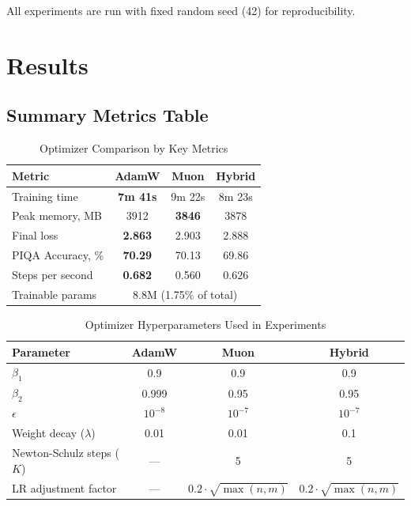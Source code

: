 \documentclass[a4paper,12pt]{article}
\begin{document}
All experiments are run with fixed random seed (42) for reproducibility.
\newpage

\section{Results}
\label{sec:results}

\subsection{Summary Metrics Table}

\begin{table}[H]
\centering
\caption{Optimizer Comparison by Key Metrics}
\label{tab:results}
\begin{tabular}{lccc}
\toprule
\textbf{Metric} & \textbf{AdamW} & \textbf{Muon} & \textbf{Hybrid} \\
\midrule
Training time & \textbf{7m 41s} & 9m 22s & 8m 23s \\
Peak memory, MB & 3912 & \textbf{3846} & 3878 \\
Final loss & \textbf{2.863} & 2.903 & 2.888 \\
PIQA Accuracy, \% & \textbf{70.29} & 70.13 & 69.86 \\
Steps per second & \textbf{0.682} & 0.560 & 0.626 \\
Trainable params & \multicolumn{3}{c}{8.8M (1.75\% of total)} \\
\bottomrule
\end{tabular}
\end{table}

\begin{table}[H]
\centering
\caption{Optimizer Hyperparameters Used in Experiments}
\label{tab:hyperparams}
\begin{tabular}{lccc}
\toprule
\textbf{Parameter} & \textbf{AdamW} & \textbf{Muon} & \textbf{Hybrid} \\
\midrule
$\beta_1$ & 0.9 & 0.9 & 0.9 \\
$\beta_2$ & 0.999 & 0.95 & 0.95 \\
$\epsilon$ & $10^{-8}$ & $10^{-7}$ & $10^{-7}$ \\
Weight decay ($\lambda$) & 0.01 & 0.01 & 0.1 \\
Newton-Schulz steps ($K$) & --- & 5 & 5 \\
LR adjustment factor & --- & $0.2 \cdot \sqrt{\max(n,m)}$ & $0.2 \cdot \sqrt{\max(n,m)}$ \\
\bottomrule
\end{tabular}
\end{table}
\end{document}
